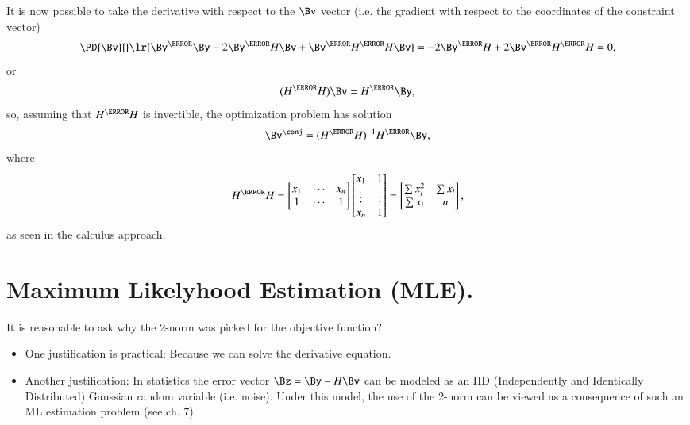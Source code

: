 It is now possible to take the derivative with respect to the \( \Bv \) vector (i.e. the gradient with respect to the coordinates of the constraint vector)
\begin{dmath}\label{eqn:L1introduction:280}
\PD{\Bv}{}
\lr{ \By^\T \By - 2 \By^\T H \Bv + \Bv^\T H^\T H \Bv }
=
- 2 \By^\T H + 2 \Bv^\T H^\T H
= 0,
\end{dmath}
or
\begin{dmath}\label{eqn:L1introduction:300}
(H^\T H) \Bv = H^\T \By,
\end{dmath}
so, assuming that \( H^\T H \) is invertible, the optimization problem has solution
\begin{dmath}\label{eqn:L1introduction:320}
\Bv^\conj =
(H^\T H)^{-1} H^\T \By,
\end{dmath}
where
\begin{dmath}\label{eqn:L1introduction:340}
H^\T H
=
\begin{bmatrix}
x_1 & \cdots & x_n \\
 1  & \cdots & 1   \\
\end{bmatrix}
\begin{bmatrix}
x_1 & 1 \\
\vdots & \vdots \\
x_n & 1
\end{bmatrix}
=
\begin{bmatrix}
\sum x_i^2 & \sum x_i \\
\sum x_i & n
\end{bmatrix}
,
\end{dmath}
as seen in the calculus approach.
\section{Maximum Likelyhood Estimation (MLE).}
It is reasonable to ask why the 2-norm was picked for the objective function?
\begin{itemize}
\item One justification is practical: Because we can solve the derivative equation.
\item Another justification: In statistics the error vector \( \Bz = \By - H \Bv \) can be modeled as an IID (Independently and Identically Distributed) Gaussian random variable (i.e. noise).  Under this model, the use of the 2-norm can be viewed as a consequence of such an ML estimation problem (see \citep{boyd2004convex} ch. 7).
\end{itemize}

